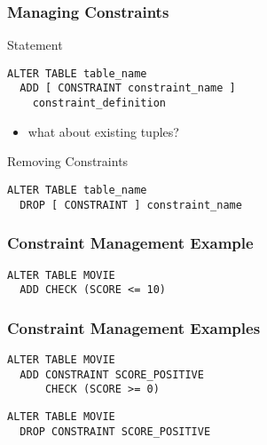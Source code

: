 \documentclass[dvipsnames]{beamer}
\theoremstyle{plain}
\begin{document}
\begin{frame}[fragile]
  \frametitle{Managing Constraints}

  \begin{block}{Statement}
    \begin{lstlisting}
ALTER TABLE table_name
  ADD [ CONSTRAINT constraint_name ]
    constraint_definition
    \end{lstlisting}
  \end{block}

  \pause
  \begin{itemize}
    \item what about existing tuples?
  \end{itemize}

  \pause
  \begin{block}{Removing Constraints}
    \begin{lstlisting}
ALTER TABLE table_name
  DROP [ CONSTRAINT ] constraint_name
    \end{lstlisting}
  \end{block}
\end{frame}

\begin{frame}[fragile]
  \frametitle{Constraint Management Example}

  \begin{example}
    \begin{lstlisting}
ALTER TABLE MOVIE
  ADD CHECK (SCORE <= 10)
    \end{lstlisting}
  \end{example}
\end{frame}

\begin{frame}[fragile]
  \frametitle{Constraint Management Examples}

  \begin{example}
    \begin{lstlisting}
ALTER TABLE MOVIE
  ADD CONSTRAINT SCORE_POSITIVE
      CHECK (SCORE >= 0)
    \end{lstlisting}
  \end{example}

  \pause
  \begin{example}
    \begin{lstlisting}
ALTER TABLE MOVIE
  DROP CONSTRAINT SCORE_POSITIVE
    \end{lstlisting}
  \end{example}
\end{frame}
\end{document}
